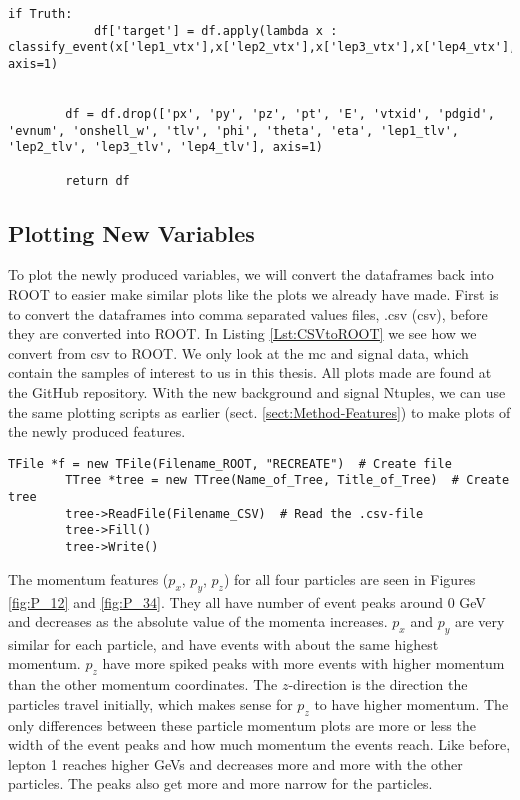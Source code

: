 \documentclass[a4paper, american, 12pt]{report}
\begin{document}
\begin{lstlisting}[caption=Making new variables., label=Lst:Making_variables]
		if Truth:
			df['target'] = df.apply(lambda x : classify_event(x['lep1_vtx'],x['lep2_vtx'],x['lep3_vtx'],x['lep4_vtx'],x['lep1_pid'],x['lep2_pid'],x['lep3_pid'],x['lep4_pid']), axis=1)
		
		
		df = df.drop(['px', 'py', 'pz', 'pt', 'E', 'vtxid', 'pdgid', 'evnum', 'onshell_w', 'tlv', 'phi', 'theta', 'eta', 'lep1_tlv', 'lep2_tlv', 'lep3_tlv', 'lep4_tlv'], axis=1)
		
		return df
	\end{lstlisting}
	
	
	\subsection{Plotting New Variables}
	\label{subsect:Method-PlottingVariables} %
	To plot the newly produced variables, we will convert the dataframes back into ROOT to easier make similar plots like the plots we already have made. First is to convert the dataframes into comma separated values files, .csv (\acrshort{csv}), before they are converted into ROOT. In Listing \ref{Lst:CSVtoROOT} we see how we convert from \acrshort{csv} to ROOT. We only look at the \acrshort{mc} and signal data, which contain the samples of interest to us in this thesis. All plots made are found at the GitHub repository. With the new background and signal Ntuples, we can use the same plotting scripts as earlier (sect. \ref{sect:Method-Features}) to make plots of the newly produced features. 
	\begin{lstlisting}[caption=Convert from CSV to ROOT., label=Lst:CSVtoROOT]
		TFile *f = new TFile(Filename_ROOT, "RECREATE")  # Create file
		TTree *tree = new TTree(Name_of_Tree, Title_of_Tree)  # Create tree
		tree->ReadFile(Filename_CSV)  # Read the .csv-file
		tree->Fill()
		tree->Write()
	\end{lstlisting}
	
	The momentum features ($p_x$, $p_y$, $p_z$) for all four particles are seen in Figures \ref{fig:P_12} and \ref{fig:P_34}. They all have number of event peaks around 0 GeV and decreases as the absolute value of the momenta increases. $p_x$ and $p_y$ are very similar for each particle, and have events with about the same highest momentum. $p_z$ have more spiked peaks with more events with higher momentum than the other momentum coordinates. The $z$-direction is the direction the particles travel initially, which makes sense for $p_z$ to have higher momentum. The only differences between these particle momentum plots are more or less the width of the event peaks and how much momentum the events reach. Like before, lepton 1 reaches higher GeVs and decreases more and more with the other particles. The peaks also get more and more narrow for the particles.
	
\end{document}
